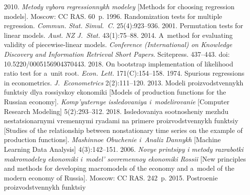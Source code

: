  \begin{multicols}{2}

\renewcommand{\bibname}{\protect\rmfamily References}

{\small\frenchspacing
 {%
 \begin{thebibliography}{99}

 2010. \textit{Metody 
vybora regressionnykh modeley} [Methods 
for choosing regression models]. Moscow: CC RAS. 60~p.
 1996. Randomization tests for 
multiple regression. 
\textit{Commun. Stat. Simul.~C.} 25(4):923--936.
 2001. Permutation tests for 
linear models. \textit{Aust. NZ J.~Stat.} 43(1):75--88.
 2014. 
A~method for evaluating validity of piecewise-linear models. 
\textit{Conference (International) on Knowledge Discovery and 
Information Retrieval  Short Papers}. 
Scitepress. 437--443. doi: 10.5220/0005156904370443.
 2018. On bootstrap implementation of likelihood 
ratio test for a~unit root. 
\textit{Econ. Lett.} 171(C):154--158.
 1974. Spurious regressions 
in econometrics. \textit{J.~Econometrics} 2(2):111--120.
 2013. Modeli proizvodstvennykh funk\-tsiy 
dlya rossiyskoy ekonomiki [Models of 
production functions for the Russian economy]. \textit{Komp'yuternye 
issledovaniya i~modelirovanie} 
[Computer Research Modeling] 5(2):293--312.
 2018. Issledovaniya 
sootnosheniy mezhdu nestatsionarnymi vremennymi ryadami na primere 
proizvodstvennykh funktsiy [Studies of the relationship between 
nonstationary time series on the example of production functions]. 
\textit{Mashinnoe Obuchenie i~Analiz 
Dannykh} [Machine Learning Data Analysis] 4(3):142--151.
 2006. \textit{Novye printsipy i metody razrabotki makromodeley 
 ekonomiki i~model' sovremennoy ekonomiki Rossii} [New principles and 
methods for developing macromodels of the economy and a~model 
of the modern economy of Russia]. Moscow: CC RAS. 242~p.
 2015. Postroenie proizvodstvennykh funk\-tsiy 

\end{thebibliography}}}
\end{multicols}
